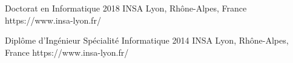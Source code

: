 \schooldiploma
{Doctorat en Informatique}
{}
{2018}
{INSA Lyon, Rhône-Alpes, France}
{https://www.insa-lyon.fr/}

\schooldiploma
{Diplôme d’Ingénieur}
{Spécialité Informatique}
{2014}
{INSA Lyon, Rhône-Alpes, France}
{https://www.insa-lyon.fr/}
